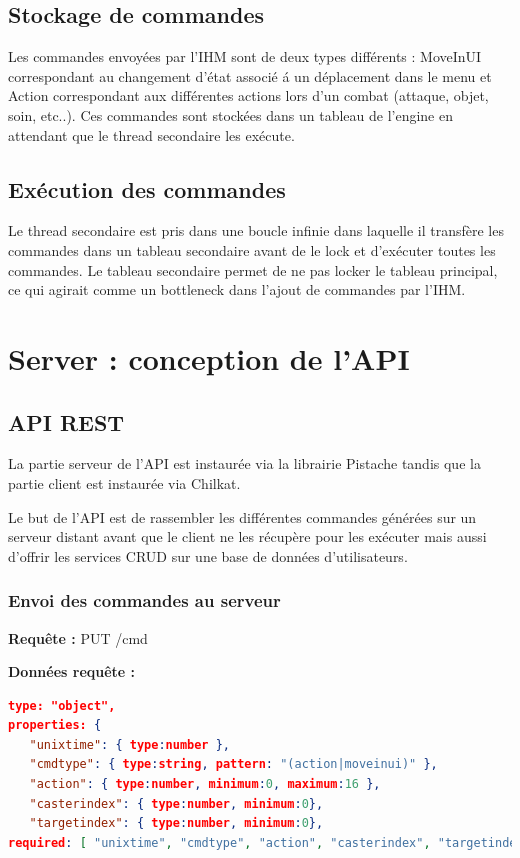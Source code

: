 \documentclass[12pt,a4paper]{report}
\begin{document}
\section{Stockage de commandes}

Les commandes envoy\'{e}es par l'IHM sont de deux types diff\'{e}rents : MoveInUI correspondant au changement d'\'{e}tat associ\'{e} \'{a} un d\'{e}placement dans le menu et Action correspondant aux diff\'{e}rentes actions lors d'un combat (attaque, objet, soin, etc..). Ces commandes sont stock\'{e}es dans un tableau de l'engine en attendant que le thread secondaire les ex\'{e}cute.

\section{Ex\'{e}cution des commandes}

Le thread secondaire est pris dans une boucle infinie dans laquelle il transf\`{e}re les commandes dans un tableau secondaire avant de le lock et d'ex\'{e}cuter toutes les commandes. Le tableau secondaire permet de ne pas locker le tableau principal, ce qui agirait comme un bottleneck dans l'ajout de commandes par l'IHM.

\chapter{Server : conception de l'API}

\section{API REST}
La partie serveur de l'API est instaurée via la librairie Pistache tandis que la partie client est instaurée via Chilkat.

Le but de l'API est de rassembler les diff\'{e}rentes commandes g\'{e}n\'{e}r\'{e}es sur un serveur distant avant que le client ne les r\'{e}cup\`{e}re pour les ex\'{e}cuter mais aussi d'offrir les services CRUD sur une base de données d'utilisateurs.

\subsection{Envoi des commandes au serveur}

\textbf{Requête :} PUT /cmd

\textbf{Données requête :} 

\begin{lstlisting}[language=JSON]
type: "object",
properties: {
   "unixtime": { type:number },
   "cmdtype": { type:string, pattern: "(action|moveinui)" },
   "action": { type:number, minimum:0, maximum:16 },
   "casterindex": { type:number, minimum:0},
   "targetindex": { type:number, minimum:0},
required: [ "unixtime", "cmdtype", "action", "casterindex", "targetindex" ]
\end{lstlisting}
\end{document}
